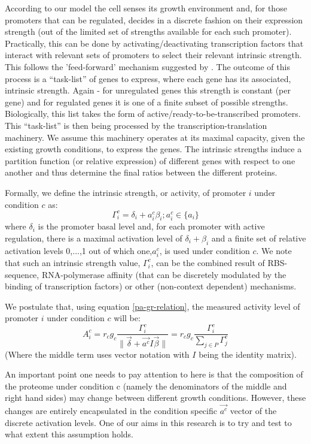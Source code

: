 \documentclass[a4page,notitlepage]{article}
\providecommand{\norm}[1]{\lVert#1\rVert}
\begin{document}
According to our model the cell senses its growth environment and, for those promoters that can be regulated, decides in a discrete fashion on their expression strength (out of the limited set of strengths available for each such promoter).
Practically, this can be done by activating/deactivating transcription factors that interact with relevant sets of promoters to select their relevant intrinsic strength.
This follows the 'feed-forward' mechanism suggested by \cite{Levy2009}.
The outcome of this process is a ``task-list'' of genes to express, where each gene has its associated, intrinsic strength.
Again - for unregulated genes this strength is constant (per gene) and for regulated genes it is one of a finite subset of possible strengths.
Biologically, this list takes the form of active/ready-to-be-transcribed promoters.
This ``task-list'' is then being processed by the transcription-translation machinery.
We assume this machinery operates at its maximal capacity, given the existing growth conditions, to express the genes.
The intrinsic strengths induce a partition function (or relative expression) of different genes with respect to one another and thus determine the final ratios between the different proteins.

Formally, we define the intrinsic strength, or activity, of promoter $i$ under condition $c$ as:
\[\Gamma^c_i=\delta_i+a^c_i\beta_i ; a^c_i\in \{a_i\}\]
where $\delta_i$ is the promoter basal level and, for each promoter with active regulation, there is a maximal activation level of $\delta_i+\beta_i$ and a finite set of relative activation levels {0,...,1} out of which one,$a^c_i$, is used under condition $c$.
We note that such an intrinsic strength value, $\Gamma^c_i$, can be the combined result of RBS-sequence, RNA-polymerase affinity (that can be discretely modulated by the binding of transcription factors) or other (non-context dependent) mechanisms.

We postulate that, using equation \ref{pa-gr-relation}, the measured activity level of promoter $i$ under condition $c$ will be:
\begin{equation}
\label{cond-act}
A^c_i=r_cg_c\frac{\Gamma^c_i}{\norm{\vec{\delta}+\vec{a^c}I\vec{\beta}}}=r_cg_c\frac{\Gamma^c_i}{\sum_{j\in P}\Gamma^c_j}
\end{equation}
(Where the middle term uses vector notation with $I$ being the identity matrix).

An important point one needs to pay attention to here is that the composition of the proteome under condition c (namely the denominators of the middle and right hand sides) may change between different growth conditions.
However, these changes are entirely encapsulated in the condition specific $\vec{a^c}$ vector of the discrete activation levels.
One of our aims in this research is to try and test to what extent this assumption holds.
\end{document}
